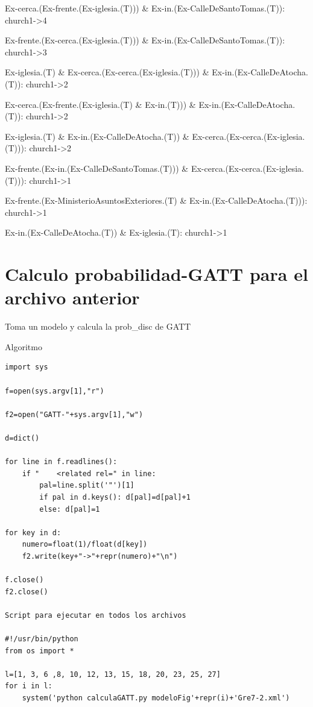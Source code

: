 {Ex-cerca.(Ex-frente.(Ex-iglesia.(T))) \& Ex-in.(Ex-CalleDeSantoTomas.(T)): church1->4

Ex-frente.(Ex-cerca.(Ex-iglesia.(T))) \& Ex-in.(Ex-CalleDeSantoTomas.(T)): church1->3

Ex-iglesia.(T) \& Ex-cerca.(Ex-cerca.(Ex-iglesia.(T))) \& Ex-in.(Ex-CalleDeAtocha.(T)): church1->2

Ex-cerca.(Ex-frente.(Ex-iglesia.(T) \& Ex-in.(T))) \& Ex-in.(Ex-CalleDeAtocha.(T)): church1->2

Ex-iglesia.(T) \& Ex-in.(Ex-CalleDeAtocha.(T)) \& Ex-cerca.(Ex-cerca.(Ex-iglesia.(T))): church1->2

Ex-frente.(Ex-in.(Ex-CalleDeSantoTomas.(T))) \& Ex-cerca.(Ex-cerca.(Ex-iglesia.(T))): church1->1

Ex-frente.(Ex-MinisterioAsuntosExteriores.(T) \& Ex-in.(Ex-CalleDeAtocha.(T))): church1->1

Ex-in.(Ex-CalleDeAtocha.(T)) \& Ex-iglesia.(T): church1->1

}

\section{Calculo probabilidad-GATT para el archivo anterior}

Toma un modelo y calcula la prob\_disc de GATT 

Algoritmo\\
\label{algoritmo-GATT}
\begin{verbatim}
import sys

f=open(sys.argv[1],"r")

f2=open("GATT-"+sys.argv[1],"w")

d=dict()

for line in f.readlines():
    if "    <related rel=" in line:
        pal=line.split('"')[1]
        if pal in d.keys(): d[pal]=d[pal]+1
        else: d[pal]=1

for key in d:
    numero=float(1)/float(d[key])
    f2.write(key+"->"+repr(numero)+"\n")

f.close()
f2.close()

Script para ejecutar en todos los archivos

#!/usr/bin/python
from os import *

l=[1, 3, 6 ,8, 10, 12, 13, 15, 18, 20, 23, 25, 27]
for i in l:
    system('python calculaGATT.py modeloFig'+repr(i)+'Gre7-2.xml')


\end{verbatim}




